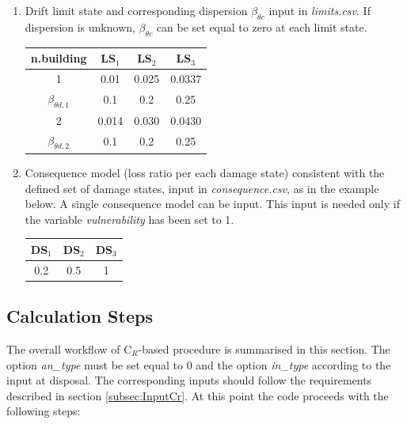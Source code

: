 \begin{enumerate}
\item Drift limit state and corresponding dispersion $\beta_{\theta c}$ input in \textit{limits.csv}. If dispersion is unknown, $\beta_{\theta c}$ can be set equal to zero at each limit state.
	\begin{table}[H]
	\centering
	\begin{tabular}{|c|c|c|c|} \hline
	\textbf{n.building} & \textbf{LS$_1$} &	\textbf{LS$_2$} &	\textbf{LS$_3$} \\ \hline
	1 & 0.01 &	0.025 & 0.0337\\ \hline
	$\beta_{\theta d, 1}$ &	0.1 & 0.2 & 0.25\\ \hline
	2 & 0.014 &	0.030 & 0.0430\\ \hline
	$\beta_{\theta d, 2}$ &	0.1 & 0.2 & 0.25\\ \hline
	\end{tabular}
	\end{table}

\item Consequence model (loss ratio per each damage state) consistent with the defined set of damage states, input in \textit{consequence.csv}, as in the example below. A single consequence model can be input. This input is needed only if the variable \textit{vulnerability} has been set to 1.
	\begin{table}[H]
	\centering
	\begin{tabular}{|c|c|c|} \hline
	\textbf{DS$_1$} & \textbf{DS$_2$} & \textbf{DS$_3$} \\ \hline
	0.2	& 0.5	 & 1\\ \hline
	\end{tabular}
	\end{table}
	
\end{enumerate}

\subsection{Calculation Steps}
The overall workflow of C$_R$-based procedure is summarised in this section. The option \textit{an\_type} must be set equal to 0 and the option \textit{in\_type} according to the input at disposal. The corresponding inputs should follow the requirements described in section \ref{subsec:InputCr}. At this point the code proceeds with the following steps:

